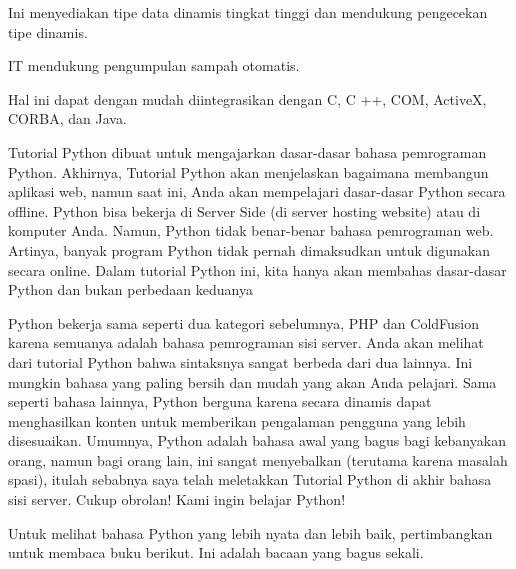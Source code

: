 \noindent 
{\fontsize{14pt}{14pt}\selectfont Ini menyediakan tipe data dinamis tingkat tinggi dan mendukung pengecekan tipe dinamis. \\} \par
\vspace{14pt}
\noindent 
{\fontsize{14pt}{14pt}\selectfont IT mendukung pengumpulan sampah otomatis. \\} \par
\vspace{14pt}
\noindent 
{\fontsize{14pt}{14pt}\selectfont Hal ini dapat dengan mudah diintegrasikan dengan C, C ++, COM, ActiveX, CORBA, dan Java. \\} \par
\noindent 
{\fontsize{14pt}{14pt}\selectfont Tutorial Python dibuat untuk mengajarkan dasar-dasar bahasa pemrograman Python. Akhirnya, Tutorial Python akan menjelaskan bagaimana membangun aplikasi web, namun saat ini, Anda akan mempelajari dasar-dasar Python secara offline. Python bisa bekerja di Server Side (di server hosting website) atau di komputer Anda. Namun, Python tidak benar-benar bahasa pemrograman web. Artinya, banyak program Python tidak pernah dimaksudkan untuk digunakan secara online. Dalam tutorial Python ini, kita hanya akan membahas dasar-dasar Python dan bukan perbedaan keduanya \\} \par
\vspace{14pt}
\noindent 
{\fontsize{14pt}{14pt}\selectfont Python bekerja sama seperti dua kategori sebelumnya, PHP dan ColdFusion karena semuanya adalah bahasa pemrograman sisi server. Anda akan melihat dari tutorial Python bahwa sintaksnya sangat berbeda dari dua lainnya. Ini mungkin bahasa yang paling bersih dan mudah yang akan Anda pelajari. Sama seperti bahasa lainnya, Python berguna karena secara dinamis dapat menghasilkan konten untuk memberikan pengalaman pengguna yang lebih disesuaikan. Umumnya, Python adalah bahasa awal yang bagus bagi kebanyakan orang, namun bagi orang lain, ini sangat menyebalkan (terutama karena masalah spasi), itulah sebabnya saya telah meletakkan Tutorial Python di akhir bahasa sisi server. Cukup obrolan! Kami ingin belajar Python! \\} \par
\vspace{14pt}
\noindent 
{\fontsize{14pt}{14pt}\selectfont Untuk melihat bahasa Python yang lebih nyata dan lebih baik, pertimbangkan untuk membaca buku berikut. Ini adalah bacaan yang bagus sekali. \\} \par

